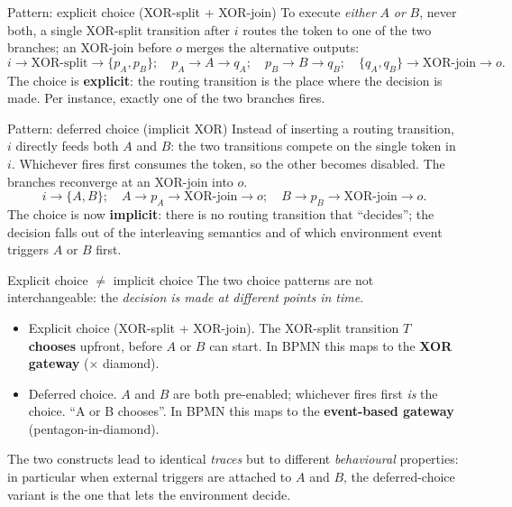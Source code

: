 \begin{examplebox}{Pattern: explicit choice (XOR-split + XOR-join)}
To execute \emph{either} $A$ \emph{or} $B$, never both, a single XOR-split transition after $i$ routes the token to one of the two branches; an XOR-join before $o$ merges the alternative outputs:
\[
  i \to \text{XOR-split} \to \{p_A, p_B\}; \quad p_A \to A \to q_A; \quad p_B \to B \to q_B; \quad \{q_A, q_B\} \to \text{XOR-join} \to o.
\]
The choice is \textbf{explicit}: the routing transition is the place where the decision is made. Per instance, exactly one of the two branches fires.
\end{examplebox}


\begin{examplebox}{Pattern: deferred choice (implicit XOR)}
Instead of inserting a routing transition, $i$ directly feeds both $A$ and $B$: the two transitions compete on the single token in $i$. Whichever fires first consumes the token, so the other becomes disabled. The branches reconverge at an XOR-join into $o$.
\[
  i \to \{A, B\}; \quad A \to p_A \to \text{XOR-join} \to o; \quad B \to p_B \to \text{XOR-join} \to o.
\]
The choice is now \textbf{implicit}: there is no routing transition that ``decides''; the decision falls out of the interleaving semantics and of which environment event triggers $A$ or $B$ first.
\end{examplebox}

\begin{notebox}{Explicit choice $\neq$ implicit choice}
The two choice patterns are not interchangeable: the \emph{decision is made at different points in time}.

\begin{itemize}
  \item Explicit choice (XOR-split + XOR-join). The XOR-split transition $T$ \textbf{chooses} upfront, before $A$ or $B$ can start. In BPMN this maps to the \textbf{XOR gateway} ($\times$ diamond).
  \item Deferred choice. $A$ and $B$ are both pre-enabled; whichever fires first \emph{is} the choice. ``A or B chooses''. In BPMN this maps to the \textbf{event-based gateway} (pentagon-in-diamond).
\end{itemize}

The two constructs lead to identical \emph{traces} but to different \emph{behavioural} properties: in particular when external triggers are attached to $A$ and $B$, the deferred-choice variant is the one that lets the environment decide.
\end{notebox}


